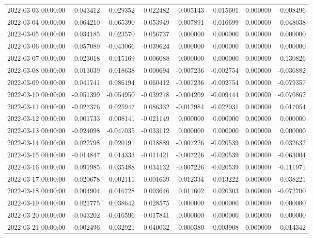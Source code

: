 \begin{tabular}{lrrrrrrr}
2022-03-03 00:00:00 & -0.043412 & -0.029352 & -0.022482 & -0.005143 & -0.015601 & 0.000000 & -0.008496 \\
2022-03-04 00:00:00 & -0.064210 & -0.065390 & -0.053949 & -0.007891 & -0.016699 & 0.000000 & 0.048038 \\
2022-03-05 00:00:00 & 0.034185 & 0.023570 & 0.056737 & 0.000000 & 0.000000 & 0.000000 & 0.000000 \\
2022-03-06 00:00:00 & -0.057089 & -0.043066 & -0.039624 & 0.000000 & 0.000000 & 0.000000 & 0.000000 \\
2022-03-07 00:00:00 & -0.023018 & -0.015169 & -0.006088 & 0.000000 & 0.000000 & 0.000000 & 0.130826 \\
2022-03-08 00:00:00 & 0.013039 & 0.018638 & 0.000694 & -0.007236 & -0.002754 & 0.000000 & -0.036882 \\
2022-03-09 00:00:00 & 0.041741 & 0.086194 & 0.060412 & -0.007236 & -0.002754 & 0.000000 & -0.079357 \\
2022-03-10 00:00:00 & -0.051399 & -0.054950 & -0.039278 & -0.004209 & -0.009444 & 0.000000 & -0.070862 \\
2022-03-11 00:00:00 & -0.027376 & 0.025947 & 0.086332 & -0.012984 & -0.022031 & 0.000000 & 0.017054 \\
2022-03-12 00:00:00 & 0.001733 & 0.008141 & -0.021149 & 0.000000 & 0.000000 & 0.000000 & 0.000000 \\
2022-03-13 00:00:00 & -0.024098 & -0.047035 & -0.033112 & 0.000000 & 0.000000 & 0.000000 & 0.000000 \\
2022-03-14 00:00:00 & 0.022798 & 0.020191 & 0.018889 & -0.007226 & -0.020539 & 0.000000 & 0.032632 \\
2022-03-15 00:00:00 & -0.014847 & 0.014333 & -0.011421 & -0.007226 & -0.020539 & 0.000000 & -0.063004 \\
2022-03-16 00:00:00 & 0.091985 & 0.035488 & 0.034132 & -0.007226 & -0.020539 & 0.000000 & -0.111971 \\
2022-03-17 00:00:00 & -0.020678 & 0.002111 & 0.001639 & 0.012334 & 0.013222 & 0.000000 & -0.038221 \\
2022-03-18 00:00:00 & 0.004904 & 0.016728 & 0.003646 & 0.011602 & 0.020303 & 0.000000 & -0.072700 \\
2022-03-19 00:00:00 & 0.021775 & 0.038642 & 0.028575 & 0.000000 & 0.000000 & 0.000000 & 0.000000 \\
2022-03-20 00:00:00 & -0.043202 & -0.016596 & -0.017841 & 0.000000 & 0.000000 & 0.000000 & 0.000000 \\
2022-03-21 00:00:00 & 0.002496 & 0.032921 & 0.040032 & -0.000380 & -0.003908 & 0.000000 & -0.014342 \\

\end{tabular}
